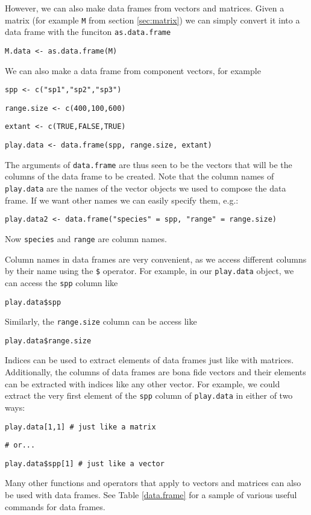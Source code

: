 \documentclass[12pt]{article}
\newcommand{\R}[1] {
	\item \texttt{#1}
}
\newenvironment{verbatim}{ 
	\indent
	\begin{list}{}{\setlength{\itemsep}{-1.5mm}}
}{
	\end{list}
}
\begin{document}
However, we can also make data frames from vectors and matrices.  Given a matrix (for example \verb+M+ from section \ref{sec:matrix}) we can simply convert it into a data frame with the funciton \verb+as.data.frame+
\begin{verbatim}
	\R{M.data <- as.data.frame(M)}
\end{verbatim}
We can also make a data frame from component vectors, for example
\begin{verbatim}
	\R{spp <- c("sp1","sp2","sp3")}
	\R{range.size <- c(400,100,600)}
	\R{extant <- c(TRUE,FALSE,TRUE)}
	\R{play.data <- data.frame(spp, range.size, extant)}
\end{verbatim}
The arguments of \verb+data.frame+ are thus seen to be the vectors that will be the columns of the data frame to be created.  Note that the column names of \verb+play.data+ are the names of the vector objects we used to compose the data frame.  If we want other names we can easily specify them, e.g.:
\begin{verbatim}
	\R{play.data2 <- data.frame("species" = spp, "range" = range.size)}
\end{verbatim} 
Now \verb+species+ and \verb+range+ are column names.

Column names in data frames are very convenient, as we access different columns by their name using the \verb+$+ operator.  For example, in our \verb+play.data+ object, we can access the \verb+spp+ column like
\begin{verbatim}
	\R{play.data\$spp}
\end{verbatim}
Similarly, the \verb+range.size+ column can be access like
\begin{verbatim}
	\R{play.data\$range.size}
\end{verbatim}

Indices can be used to extract elements of data frames just like with matrices.  Additionally, the columns of data frames are bona fide vectors and their elements can be extracted with indices like any other vector.  For example, we could extract the very first element of the \verb+spp+ column of \verb+play.data+ in either of two ways:
\begin{verbatim}
	\R{play.data[1,1]  \# just like a matrix}
	\R{\# or...}
	\R{play.data\$spp[1]	\# just like a vector}
\end{verbatim}
Many other functions and operators that apply to vectors and matrices can also be used with data frames.  See Table \ref{data.frame} for a sample of various useful commands for data frames.
\end{document}
